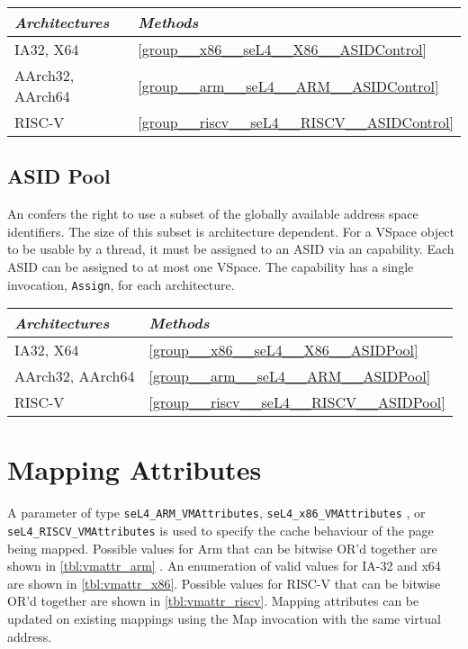 \begin{tabularx}{\textwidth}{Xl} \toprule
\emph{Architectures} & \emph{Methods} \\ \midrule
IA32, X64            & \autoref{group__x86__seL4__X86__ASIDControl} \\
AArch32, AArch64     & \autoref{group__arm__seL4__ARM__ASIDControl} \\
RISC-V               & \autoref{group__riscv__seL4__RISCV__ASIDControl} \\
\bottomrule
\end{tabularx}

\subsection{ASID Pool}

An  confers the right to use a subset of the globally available address space
identifiers. The size of this subset is architecture dependent. For a VSpace object to be usable by
a thread, it must be assigned to an ASID via an  capability. Each ASID can be
assigned to at most one VSpace. The  capability has a single invocation,
\texttt{Assign}, for each architecture.

\begin{tabularx}{\textwidth}{Xl} \toprule
\emph{Architectures} & \emph{Methods} \\ \midrule
IA32, X64            & \autoref{group__x86__seL4__X86__ASIDPool} \\
AArch32, AArch64     & \autoref{group__arm__seL4__ARM__ASIDPool} \\
RISC-V               & \autoref{group__riscv__seL4__RISCV__ASIDPool} \\
\bottomrule
\end{tabularx}

\section{Mapping Attributes}
A parameter of type \texttt{seL4\_ARM\_VMAttributes}, \texttt{seL4\_x86\_VMAttributes}
, or \texttt{seL4\_RISCV\_VMAttributes} is used to specify the cache behaviour of the
page being mapped. Possible values for Arm that can be bitwise OR'd together are
shown in \autoref{tbl:vmattr_arm} \ifxeightsix. An enumeration of valid values
for IA-32 and x64 are shown in \autoref{tbl:vmattr_x86}\fi. Possible values for RISC-V that
can be bitwise OR'd together are shown in \autoref{tbl:vmattr_riscv}. Mapping attributes
can be updated on existing mappings using the Map invocation with the same virtual address.

